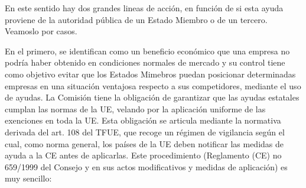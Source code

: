 \documentclass[10pt,a4paper]{article}
\begin{document}
En este sentido hay dos grandes lineas de acción, en función de si esta ayuda proviene de la autoridad pública de un Estado Miembro o de un tercero. Veamoslo por casos.

En el primero, se identifican como un beneficio económico que una empresa no podría haber obtenido en condiciones normales de mercado  y su control tiene como objetivo evitar que los Estados Mimebros puedan posicionar determinadas empresas en una situación ventajosa respecto a sus competidores, mediante el uso de ayudas. La Comisión tiene la obligación de garantizar que las ayudas estatales cumplan las normas de la UE, velando por la aplicación uniforme de las exenciones en toda la UE. Esta obligación se articula mediante la normativa derivada del art. 108 del TFUE, que recoge un régimen de vigilancia según el cual, como norma general, los países de la UE deben notificar las medidas de ayuda a la CE antes de aplicarlas. Este procedimiento (Reglamento (CE) no 659/1999 del Consejo y en sus actos modificativos y medidas de aplicación) es muy sencillo:
\end{document}
